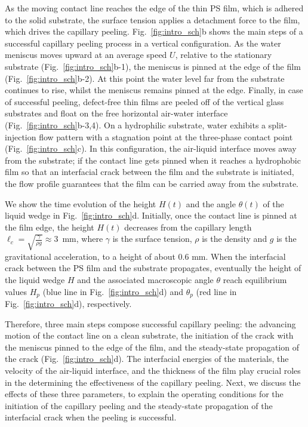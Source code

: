 \documentclass[10pt,twocolumn]{article}
\begin{document}
As the moving contact line reaches the edge of the thin PS film, which is adhered to the solid substrate, the surface tension applies a detachment force to the film, which drives the capillary peeling.
Fig.~\ref{fig:intro_sch}b shows the main steps of a successful capillary peeling process in a vertical configuration.
As the water meniscus moves upward at an average speed $U$, relative to the stationary substrate (Fig.~\ref{fig:intro_sch}b-1), the meniscus is pinned at the edge of the film (Fig.~\ref{fig:intro_sch}b-2).
At this point the water level far from the substrate continues to rise, whilst the meniscus remains pinned at the edge.
Finally, in case of successful peeling, defect-free thin films are peeled off of the vertical glass substrates and float on the free horizontal air-water interface (Fig.~\ref{fig:intro_sch}b-3,4).
On a hydrophilic substrate, water exhibits a split-injection flow pattern with a stagnation point at the three-phase contact point (Fig.~\ref{fig:intro_sch}c).
In this configuration, the air-liquid interface moves away from the substrate; if the contact line gets pinned when it reaches a hydrophobic film so that an interfacial crack between the film and the substrate is initiated, the flow profile guarantees that the film can be carried away from the substrate.

We show the time evolution of the height $H(t)$ and the angle $\theta(t)$ of the liquid wedge in Fig.~\ref{fig:intro_sch}d.
Initially, once the contact line is pinned at the film edge, the height $H(t)$ decreases from the capillary length $\ell_c = \sqrt{\frac{\gamma}{\rho g}} \approx 3$~mm, where $\gamma$ is the surface tension, $\rho$ is the density and $g$ is the gravitational acceleration, to a height of about 0.6 mm.
When the interfacial crack between the PS film and the substrate propagates, eventually the height of the liquid wedge $H$ and the associated macroscopic angle $\theta$ reach equilibrium values $H_p$ (blue line in Fig.~\ref{fig:intro_sch}d) and $\theta_p$ (red line in Fig.~\ref{fig:intro_sch}d), respectively.

Therefore, three main steps compose successful capillary peeling: the advancing motion of the contact line on a clean substrate, the initiation of the crack with the meniscus pinned to the edge of the film, and the steady-state propagation of the crack (Fig.~\ref{fig:intro_sch}d).
The interfacial energies of the materials, the velocity of the air-liquid interface, and the thickness of the film play crucial roles in the determining the effectiveness of the capillary peeling.
Next, we discuss the effects of these three parameters, to explain the operating conditions for the initiation of the capillary peeling and the steady-state propagation of the interfacial crack when the peeling is successful.
\end{document}
